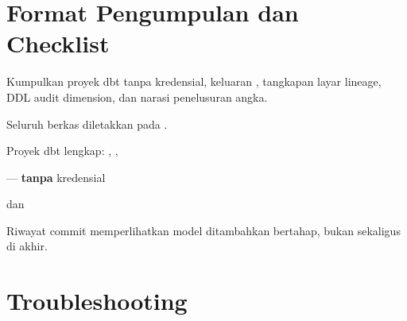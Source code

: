 \section{Format Pengumpulan dan Checklist}

Kumpulkan proyek dbt tanpa kredensial, keluaran , tangkapan
layar lineage, DDL audit dimension, dan narasi penelusuran angka.

Seluruh berkas diletakkan pada .

\begin{ceklis}
  \item {}
  \item Proyek dbt lengkap: , ,
  \item {} --- \textbf{tanpa} kredensial
  \item {}
  \item {} dan 
  \item {}
  \item {}
  \item Riwayat commit memperlihatkan model ditambahkan bertahap, bukan
        sekaligus di akhir.
\end{ceklis}

\section{Troubleshooting}

